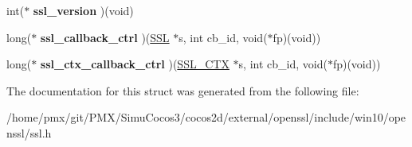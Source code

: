 \begin{DoxyCompactItemize}
int($\ast$ {\bfseries ssl\+\_\+version} )(void)
\item 
\mbox{\label{structssl__method__st_ac8ad5e3ad9b93cad8439c0af2c280c56}} 
long($\ast$ {\bfseries ssl\+\_\+callback\+\_\+ctrl} )(\hyperlink{structssl__st}{S\+SL} $\ast$s, int cb\+\_\+id, void($\ast$fp)(void))
\item 
\mbox{\label{structssl__method__st_a993fb1170221e955a38978690bbfde45}} 
long($\ast$ {\bfseries ssl\+\_\+ctx\+\_\+callback\+\_\+ctrl} )(\hyperlink{structssl__ctx__st}{S\+S\+L\+\_\+\+C\+TX} $\ast$s, int cb\+\_\+id, void($\ast$fp)(void))
\end{DoxyCompactItemize}


The documentation for this struct was generated from the following file\+:\begin{DoxyCompactItemize}
\item 
/home/pmx/git/\+P\+M\+X/\+Simu\+Cocos3/cocos2d/external/openssl/include/win10/openssl/ssl.\+h\end{DoxyCompactItemize}
